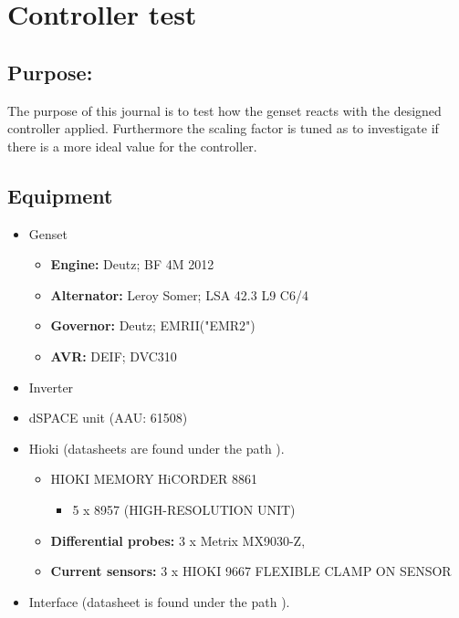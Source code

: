 \section{Controller test}
\label{app:controller_test}
\subsection*{Purpose:}
The purpose of this journal is to test how the genset reacts with the designed controller applied. Furthermore the scaling factor is tuned as to investigate if there is a more ideal value for the controller. 

\subsection*{Equipment}

\begin{itemize}
	\item Genset
		\begin{itemize}
			\item \textbf{Engine:} Deutz; BF 4M 2012
			\item \textbf{Alternator:} Leroy Somer; LSA 42.3 L9 C6/4
			\item \textbf{Governor:} Deutz; EMRII("EMR2")
			\item \textbf{AVR:} DEIF; DVC310 
		\end{itemize}
		\item Inverter
		\item dSPACE unit (AAU: 61508)
		\item Hioki (datasheets are found under the path ).
		\begin{itemize}
			\item HIOKI MEMORY HiCORDER 8861
			\begin{itemize}
				\item 5 x 8957 (HIGH-RESOLUTION UNIT)
			\end{itemize}
			\item \textbf{Differential probes:} 3 x Metrix MX9030-Z,
			\item \textbf{Current sensors:} 3 x HIOKI 9667 FLEXIBLE CLAMP ON SENSOR
		\end{itemize}
		\item Interface (datasheet is found under the path ).
\end{itemize}	


